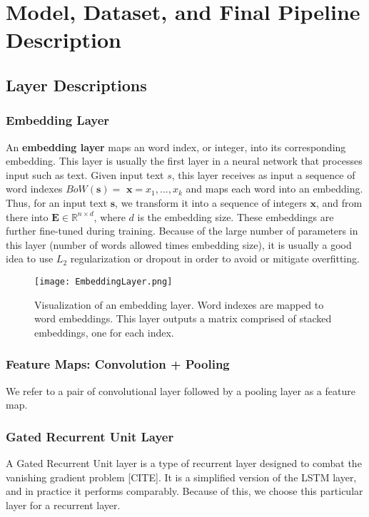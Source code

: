 
\chapter{Model, Dataset, and Final Pipeline Description}
\section{Layer Descriptions}
\subsection{Embedding Layer}
An \textbf{embedding layer} maps an word index, or integer, into its corresponding embedding.
This layer is usually the first layer in a neural network that processes input such as text.
Given input text $s$, this layer receives as input a sequence of word indexes $BoW(\bm{s})=$ $\bm{x} = x_1,...,x_k$
and maps each word into an embedding.
Thus, for an input text $\bm{s}$, we transform it into a sequence of integers $\bm{x}$, and from there into $\mathbf{E} \in \mathbb{R}^{n \times d}$, where $d$ is
the embedding size. These embeddings are further fine-tuned during training. Because of the large number of
parameters in this layer (number of words allowed times embedding size), it is usually a good idea to
use $L_2$ regularization or dropout in order to avoid or mitigate overfitting.

\begin{figure}[H]
\caption{Visualization of an embedding layer. Word indexes are mapped to word embeddings. This
layer outputs a matrix comprised of stacked embeddings, one for each index.}
\centering
\texttt{[image: EmbeddingLayer.png]}
\end{figure}

\subsection{Feature Maps: Convolution + Pooling}

We refer to a pair of convolutional layer followed by a pooling layer as a feature map.

\subsection{Gated Recurrent Unit Layer}
A Gated Recurrent Unit layer is a type of recurrent layer designed to combat the vanishing gradient
problem [CITE]. It is a simplified version of the LSTM layer, and in practice it performs comparably.
Because of this, we choose this particular layer for a recurrent layer.


